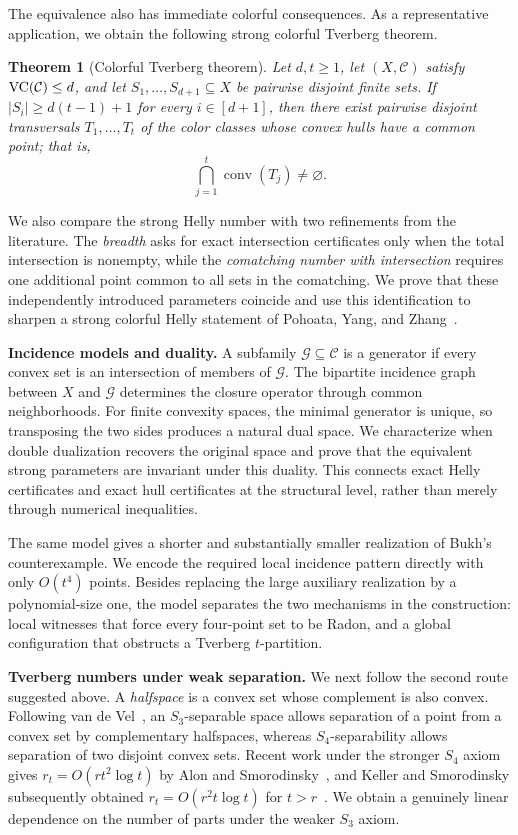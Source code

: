 \documentclass[11pt]{article}
\newtheorem{thm}{Theorem}[section]%
\theoremstyle{definition}
\newcommand{\C}{\mathcal{C}}
\newcommand{\G}{\mathcal{G}}
\newcommand{\conv}{\operatorname{conv}}
\newcommand{\VC}{\textup{VC}}
\begin{document}
The equivalence also has immediate colorful consequences. As a representative application, we obtain the following strong colorful Tverberg theorem.

\begin{thm}[Colorful Tverberg theorem]
Let $d,t\ge1$, let $(X,\C)$ satisfy $\VC(\C)\le d$, and let $S_1,\ldots,S_{d+1}\subseteq X$ be pairwise disjoint finite sets. If
$|S_i|\ge d(t-1)+1$
for every $i\in[d+1]$, then there exist pairwise disjoint transversals $T_1,\ldots,T_t$ of the color classes whose convex hulls have a common point; that is,
\[
\bigcap_{j=1}^t\conv(T_j)\ne\varnothing.
\]
\end{thm}

We also compare the strong Helly number with two refinements from the literature. The \emph{breadth} asks for exact intersection certificates only when the total intersection is nonempty, while the \emph{comatching number with intersection} requires one additional point common to all sets in the comatching. We prove that these independently introduced parameters coincide and use this identification to sharpen a strong colorful Helly statement of Pohoata, Yang, and Zhang~\cite{aschenbrenner2016vapnik,pohoata2025colorful}.

\medskip
\noindent\textbf{Incidence models and duality.}
A subfamily $\G\subseteq\C$ is a generator if every convex set is an intersection of members of $\G$. The bipartite incidence graph between $X$ and $\G$ determines the closure operator through common neighborhoods. For finite convexity spaces, the minimal generator is unique, so transposing the two sides produces a natural dual space. We characterize when double dualization recovers the original space and prove that the equivalent strong parameters are invariant under this duality. This connects exact Helly certificates and exact hull certificates at the structural level, rather than merely through numerical inequalities.

The same model gives a shorter and substantially smaller realization of Bukh's counterexample. We encode the required local incidence pattern directly with only $O(t^4)$ points. Besides replacing the large auxiliary realization by a polynomial-size one, the model separates the two mechanisms in the construction: local witnesses that force every four-point set to be Radon, and a global configuration that obstructs a Tverberg $t$-partition.

\medskip
\noindent\textbf{Tverberg numbers under weak separation.}
We next follow the second route suggested above. A \emph{halfspace} is a convex set whose complement is also convex. Following van de Vel~\cite{van1993theory}, an $S_3$-separable space allows separation of a point from a convex set by complementary halfspaces, whereas $S_4$-separability allows separation of two disjoint convex sets. Recent work under the stronger $S_4$ axiom gives
$r_t=O(rt^2\log t)$
by Alon and Smorodinsky~\cite{AlonSmorodinsky}, and Keller and Smorodinsky subsequently obtained
$r_t=O(r^2t\log t)$
for $t>r$~\cite{keller2026colorful}. We obtain a genuinely linear dependence on the number of parts under the weaker $S_3$ axiom.
\end{document}
